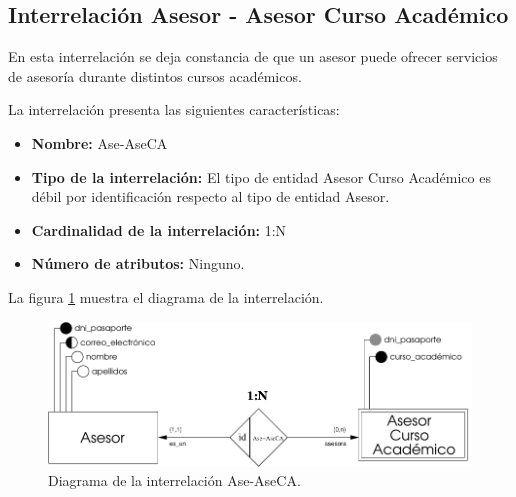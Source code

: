 \subsection{Interrelación Asesor - Asesor Curso Académico}

   \begin{description}
      \item[Definición] En esta interrelación se deja constancia de que un
      asesor puede ofrecer servicios de asesoría durante distintos cursos
      académicos.

      \item[Características] La interrelación presenta las siguientes
                             características:

         \begin{itemize}
            \item \textbf{Nombre:} Ase-AseCA
            \item \textbf{Tipo de la interrelación:} El tipo de entidad
                  Asesor Curso Académico es débil por identificación respecto al
                  tipo de entidad Asesor.
            \item \textbf{Cardinalidad de la interrelación:} 1:N
            \item \textbf{Número de atributos:} Ninguno.
         \end{itemize}

      \item[Diagrama] La figura \ref{diagramaAse-AseCA} muestra el diagrama de la
                      interrelación.

      \item \begin{figure}[!ht]
            \begin{center}
            \includegraphics[]{07.Modelo_Entidad-Interrelacion/7.3.Analisis_Interrelaciones/diagramas/Ase-AseCA.pdf}
            \caption{Diagrama de la interrelación Ase-AseCA.}
            \label{diagramaAse-AseCA}
            \end{center}
         \end{figure}


\end{description}
